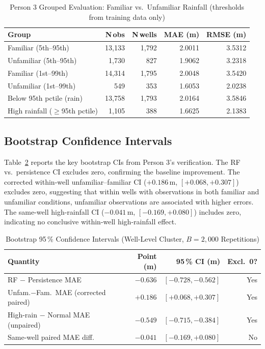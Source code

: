 \documentclass[conference]{IEEEtran}
\begin{document}
\begin{table}[htbp]
\centering
\caption{Person 3 Grouped Evaluation: Familiar vs.\ Unfamiliar Rainfall
         (thresholds from training data only)}
\label{tab:p3_grouped}
\begin{tabular}{@{}lrrrr@{}}
\toprule
\textbf{Group} & \textbf{N\,obs} & \textbf{N\,wells} & \textbf{MAE (m)} & \textbf{RMSE (m)} \\
\midrule
Familiar (5th--95th)   & 13{,}133 & 1{,}792 & 2.0011 & 3.5312 \\
Unfamiliar (5th--95th) &  1{,}730 &   827   & 1.9062 & 3.2318 \\
Familiar (1st--99th)   & 14{,}314 & 1{,}795 & 2.0048 & 3.5420 \\
Unfamiliar (1st--99th) &    549   &   353   & 1.6053 & 2.0238 \\
Below 95th pctile (rain) & 13{,}758 & 1{,}793 & 2.0164 & 3.5846 \\
High rainfall ($\geq$95th pctile) & 1{,}105 & 388 & 1.6625 & 2.1383 \\
\bottomrule
\end{tabular}
\end{table}

\subsection{Bootstrap Confidence Intervals}

Table~\ref{tab:bootstrap} reports the key bootstrap CIs from Person 3's
verification.
The RF vs.\ persistence CI excludes zero, confirming the baseline
improvement.
The corrected within-well unfamiliar--familiar CI ($+0.186$\,m,
$[+0.068, +0.307]$) excludes zero, suggesting that within wells with
observations in both familiar and unfamiliar conditions, unfamiliar
observations are associated with higher errors.
The same-well high-rainfall CI ($-0.041$\,m, $[-0.169, +0.080]$) includes
zero, indicating no conclusive within-well high-rainfall effect.

\begin{table}[htbp]
\centering
\caption{Bootstrap 95\,\% Confidence Intervals (Well-Level Cluster,
         $B = 2{,}000$ Repetitions)}
\label{tab:bootstrap}
\begin{tabular}{@{}p{4.2cm}rrr@{}}
\toprule
\textbf{Quantity} & \textbf{Point (m)} & \textbf{95\,\% CI (m)} & \textbf{Excl.\ 0?} \\
\midrule
RF $-$ Persistence MAE        & $-0.636$ & $[-0.728, -0.562]$ & Yes \\
Unfam.$-$Fam.\ MAE (corrected paired) & $+0.186$ & $[+0.068, +0.307]$ & Yes \\
High-rain $-$ Normal MAE (unpaired) & $-0.549$ & $[-0.715, -0.384]$ & Yes \\
Same-well paired MAE diff.     & $-0.041$ & $[-0.169, +0.080]$ & No \\
\bottomrule
\end{tabular}
\end{table}
\end{document}
